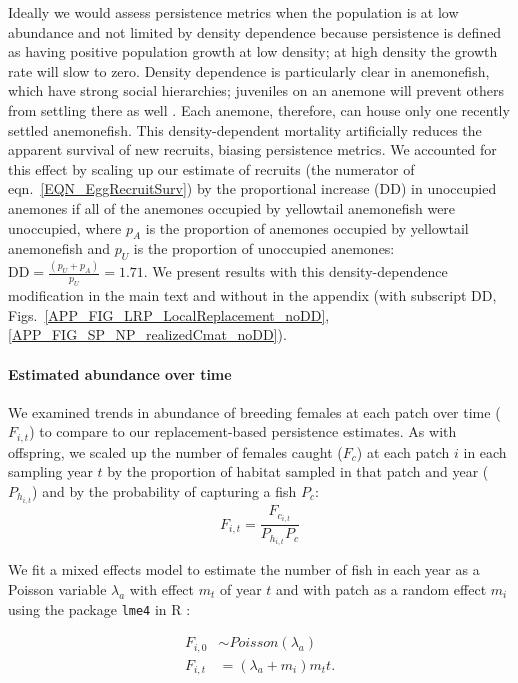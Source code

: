 \documentclass[12pt, oneside]{article}   	%
\begin{document}
Ideally we would assess persistence metrics when the population is at low abundance and not limited by density dependence because persistence is defined as having positive population growth at low density; at high density the growth rate will slow to zero. Density dependence is particularly clear in anemonefish, which have strong social hierarchies; juveniles on an anemone will prevent others from settling there as well \citep[seen in \textit{A. percula,}][]{buston2003forcible}. Each anemone, therefore, can house only one recently settled anemonefish. This density-dependent mortality artificially reduces the apparent survival of new recruits, biasing persistence metrics. We accounted for this effect by scaling up our estimate of recruits (the numerator of eqn.\ \ref{EQN_EggRecruitSurv}) by the proportional increase ($\text{DD}$) in unoccupied anemones if all of the anemones occupied by yellowtail anemonefish were unoccupied, where $p_A$ is the proportion of anemones occupied by yellowtail anemonefish and $p_U$ is the proportion of unoccupied anemones: $\text{DD} = \frac{(p_U + p_A)}{p_U} = 1.71$. We present results with this density-dependence modification in the main text and without in the appendix (with subscript DD, Figs.\ \ref{APP_FIG_LRP_LocalReplacement_noDD}, \ref{APP_FIG_SP_NP_realizedCmat_noDD}).

\paragraph*{Estimated abundance over time}

We examined trends in abundance of breeding females at each patch over time ($F_{i,t}$) to compare to our replacement-based persistence estimates. As with offspring, we scaled up the number of females caught ($F_c$) at each patch $i$ in each sampling year $t$ by the proportion of habitat sampled in that patch and year ($P_{h_{i,t}}$) and by the probability of capturing a fish $P_c$:
\begin{equation}
F_{i,t} = \frac{F_{c_{i,t}}}{P_{h_{i,t}}P_c}
\end{equation}

We fit a mixed effects model to estimate the number of fish in each year as a Poisson variable $\lambda_a$ with effect $m_t$ of year $t$ and with patch as a random effect $m_i$ using the package \texttt{lme4} in R \citep{lme42015package}:

\begin{equation} \label{EQN_Abundance}
\begin{split}
F_{i,0} & \sim Poisson(\lambda_a) \\
F_{i,t} & = (\lambda_a + m_i)m_t t.
\end{split}
\end{equation}
\end{document}
